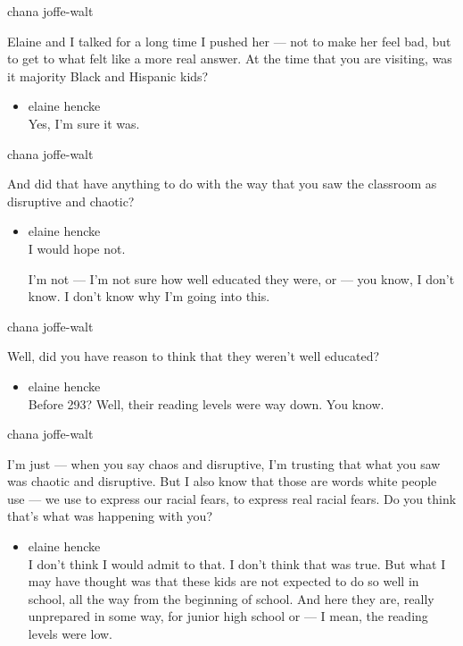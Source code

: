 chana joffe-walt

Elaine and I talked for a long time I pushed her --- not to make her
feel bad, but to get to what felt like a more real answer. At the time
that you are visiting, was it majority Black and Hispanic kids?

\begin{itemize}
\tightlist
\item
  elaine hencke\\
  Yes, I'm sure it was.
\end{itemize}

chana joffe-walt

And did that have anything to do with the way that you saw the classroom
as disruptive and chaotic?

\begin{itemize}
\item
  elaine hencke\\
  I would hope not.

  I'm not --- I'm not sure how well educated they were, or --- you know,
  I don't know. I don't know why I'm going into this.
\end{itemize}

chana joffe-walt

Well, did you have reason to think that they weren't well educated?

\begin{itemize}
\tightlist
\item
  elaine hencke\\
  Before 293? Well, their reading levels were way down. You know.
\end{itemize}

chana joffe-walt

I'm just --- when you say chaos and disruptive, I'm trusting that what
you saw was chaotic and disruptive. But I also know that those are words
white people use --- we use to express our racial fears, to express real
racial fears. Do you think that's what was happening with you?

\begin{itemize}
\tightlist
\item
  elaine hencke\\
  I don't think I would admit to that. I don't think that was true. But
  what I may have thought was that these kids are not expected to do so
  well in school, all the way from the beginning of school. And here
  they are, really unprepared in some way, for junior high school or ---
  I mean, the reading levels were low.
\end{itemize}


